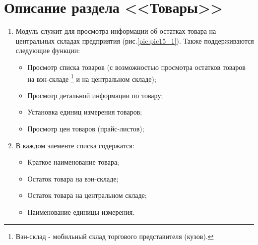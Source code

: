 \section{Описание раздела <<Товары>>}\label{sec:sec14_1}
\begin{enumerate}[\thesection .1]
\item Модуль служит для просмотра информации об остатках товара на центральных складах предприятия (рис.\ref {pic:pic15_1}). Также поддерживаются следующие функции: 
\begin{itemize}
	\item Просмотр списка товаров (с возможностью просмотра остатков товаров на вэн-складе \footnote{Вэн-склад - мобильный склад торгового представителя (кузов).} и на центральном складе);
	\item Просмотр детальной информации по товару;
	\item Установка единиц измерения товаров;
	\item Просмотр цен товаров (прайс-листов);
\end{itemize}
\item В каждом элементе списка содержатся:
\begin{itemize}
	\item Краткое наименование товара;
	\item Остаток товара на вэн-складе;
	\item Остаток товара на центральном складе;
	\item Наименование единицы измерения.
\end{itemize}


\end{enumerate}
